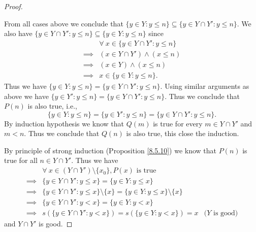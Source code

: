\begin{proof}
\begin{itemize}
    \end{itemize}
    From all cases above we conclude that \(\{y \in Y : y \leq n\} \subseteq \{y \in Y \cap Y' : y \leq n\}\).
    We also have \(\{y \in Y \cap Y' : y \leq n\} \subseteq \{y \in Y : y \leq n\}\) since
    \begin{align*}
                 & \forall\ x \in \{y \in Y \cap Y' : y \leq n\} \\
        \implies & (x \in Y \cap Y') \land (x \leq n)            \\
        \implies & (x \in Y) \land (x \leq n)                    \\
        \implies & x \in \{y \in Y : y \leq n\}.
    \end{align*}
    Thus we have \(\{y \in Y : y \leq n\} = \{y \in Y \cap Y' : y \leq n\}\).
    Using similar arguments as above we have \(\{y \in Y' : y \leq n\} = \{y \in Y \cap Y' : y \leq n\}\).
    Thus we conclude that \(P(n)\) is also true, i.e.,
    \[
        \{y \in Y : y \leq n\} = \{y \in Y' : y \leq n\} = \{y \in Y \cap Y' : y \leq n\}.
    \]
    By induction hypothesis we know that \(Q(m)\) is true for every \(m \in Y \cap Y'\) and \(m < n\).
    Thus we conclude that \(Q(n)\) is also true, this close the induction.

    By principle of strong induction (Proposition \ref{8.5.10}) we know that \(P(n)\) is true for all \(n \in Y \cap Y'\).
    Thus we have
    \begin{align*}
                 & \forall\ x \in (Y \cap Y') \setminus \{x_0\}, P(x) \text{ is true}                                               \\
        \implies & \{y \in Y \cap Y' : y \leq x\} = \{y \in Y : y \leq x\}                                                          \\
        \implies & \{y \in Y \cap Y' : y \leq x\} \setminus \{x\} = \{y \in Y : y \leq x\} \setminus \{x\}                          \\
        \implies & \{y \in Y \cap Y' : y < x\} = \{y \in Y : y < x\}                                                                \\
        \implies & s(\{y \in Y \cap Y' : y < x\}) = s(\{y \in Y : y < x\}) = x                             & \text{(\(Y\) is good)}
    \end{align*}
    and \(Y \cap Y'\) is good.


\end{proof}
